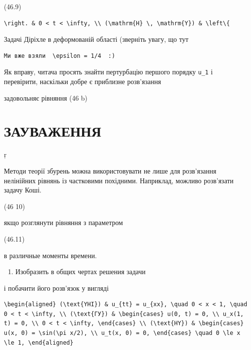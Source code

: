 \documentclass[
  ukrainian,
]{article}
\providecommand{\tightlist}{%
  \setlength{\itemsep}{0pt}\setlength{\parskip}{0pt}}
\begin{document}
(46.9)

\begin{verbatim}
\right. & 0 < t < \infty, \\ (\mathrm{H} \, \mathrm{Y}) & \left\{
\end{verbatim}

Задачі Діріхле в деформованій області (зверніть увагу, що тут

\begin{verbatim}
Ми вже взяли  \epsilon = 1/4  :)
\end{verbatim}

Як вправу, читача просять знайти пертурбацію першого порядку
\texttt{u\_1} і перевірити, наскільки добре є приблизне розв'язання

задовольняє рівняння (46 b)

\section{ЗАУВАЖЕННЯ}\label{ux437ux430ux443ux432ux430ux436ux435ux43dux43dux44f-4}

ŗ

Методи теорії збурень можна використовувати не лише для розв'язання
нелінійних рівнянь із частковими похідними. Наприклад, можливо
розв'язати задачу Коші.

(46 10)

якщо розглянути рівняння з параметром

(46.11)

в различные моменты времени.

\begin{enumerate}
\def\labelenumi{\arabic{enumi}.}
\setcounter{enumi}{1}
\tightlist
\item
  Изобразить в общих чертах решения задачи
\end{enumerate}

і побачити його розв'язок у вигляді

\begin{verbatim}
\begin{aligned} (\text{YHI}) & u_{tt} = u_{xx}, \quad 0 < x < 1, \quad 0 < t < \infty, \\ (\text{ГУ}) & \begin{cases} u(0, t) = 0, \\ u_x(1, t) = 0, \\ 0 < t < \infty, \end{cases} \\ (\text{HY}) & \begin{cases} u(x, 0) = \sin(\pi x/2), \\ u_t(x, 0) = 0, \end{cases} \quad 0 \le x \le 1, \end{aligned}
\end{verbatim}
\end{document}
